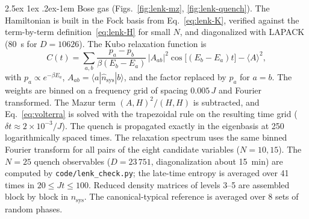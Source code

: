 \documentclass[10pt,a4paper]{article}
\makeatletter
\renewcommand{\paragraph}{\@startsection{paragraph}{4}{\z@}%
  {2.5ex \@plus 1ex \@minus .2ex}{-1em}%
  {\normalfont\fontsize{14pt}{17pt}\selectfont\bfseries}}
\newcommand{\sprod}[2]{\left(#1 , #2\right)}
\makeatother
\begin{document}
\paragraph{Bose gas (Figs.~\ref{fig:lenk-mz}, \ref{fig:lenk-quench}).}
The Hamiltonian is built in the Fock basis from Eq.~\eqref{eq:lenk-K}, verified against the term-by-term definition~\eqref{eq:lenk-H} for small $ N $, and diagonalized with LAPACK (80~s for $ D = 10626 $). The Kubo relaxation function is
\begin{equation}
  C(t) = \sum_{a,b} \frac{p_a - p_b}{\beta (E_b - E_a)} \, |A_{ab}|^2 \cos\big[(E_b - E_a) t\big] - \langle A \rangle^2 ,
  \label{eq:kubo-spectral}
\end{equation}
with $ p_a \propto e^{-\beta E_a} $, $ A_{ab} = \langle a | \hat n_{\mathrm{sys}} | b \rangle $, and the factor replaced by $ p_a $ for $ a = b $. The weights are binned on a frequency grid of spacing $ 0.005\,J $ and Fourier transformed. The Mazur term $ \sprod{A}{H}^2/\sprod{H}{H} $ is subtracted, and Eq.~\eqref{eq:volterra} is solved with the trapezoidal rule on the resulting time grid ($ \delta t \approx 2\times 10^{-3}/J $). The quench is propagated exactly in the eigenbasis at 250 logarithmically spaced times. The relaxation spectrum uses the same binned Fourier transform for all pairs of the eight candidate variables ($ N = 10, 15 $). The $ N = 25 $ quench observables ($ D = 23\,751 $, diagonalization about 15~min) are computed by \texttt{code/lenk\_check.py}; the late-time entropy is averaged over 41 times in $ 20 \le Jt \le 100 $. Reduced density matrices of levels 3--5 are assembled block by block in $ n_{\mathrm{sys}} $. The canonical-typical reference is averaged over 8 sets of random phases.
\end{document}
